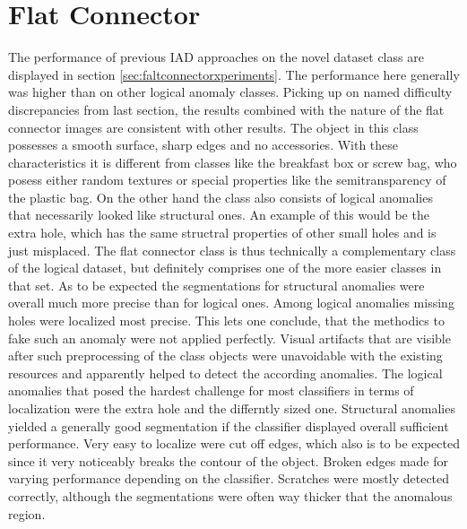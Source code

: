 

\section{Flat Connector}
\label{sec:flatconnectordiscussion}

The performance of previous IAD approaches on the novel dataset class are displayed in section \ref{sec:faltconnectorxperiments}. The performance here generally was higher 
than on other logical anomaly classes. Picking up on named difficulty discrepancies from last section, the results combined with the nature of the flat connector images 
are consistent with other results. The object in this class possesses a smooth surface, sharp edges and no accessories. With these 
characteristics it is different from classes like the breakfast box or screw bag, who posess either random textures or special properties 
like the semitransparency of the plastic bag. On the other hand the class also consists of logical anomalies that necessarily looked 
like structural ones. An example of this would be the extra hole, which has the same structral properties of other small holes and is 
just misplaced. The flat connector class is thus technically a complementary class of the logical dataset, but definitely comprises 
one of the more easier classes in that set. \newline
As to be expected the segmentations for structural anomalies were overall much more precise than for logical ones. Among logical anomalies 
missing holes were localized most precise. This lets one conclude, that the methodics to fake such an anomaly were not applied perfectly. 
Visual artifacts that are visible after such preprocessing of the class objects were unavoidable with the existing resources and apparently 
helped to detect the according anomalies. The logical anomalies that posed the hardest challenge for most classifiers in terms of localization 
were the extra hole and the differntly sized one. \newline
Structural anomalies yielded a generally good segmentation if the classifier displayed overall sufficient performance. Very easy to localize 
were cut off edges, which also is to be expected since it very noticeably breaks the contour of the object. Broken edges made for 
varying performance depending on the classifier. Scratches were mostly detected correctly, although the segmentations were often 
way thicker that the anomalous region.



